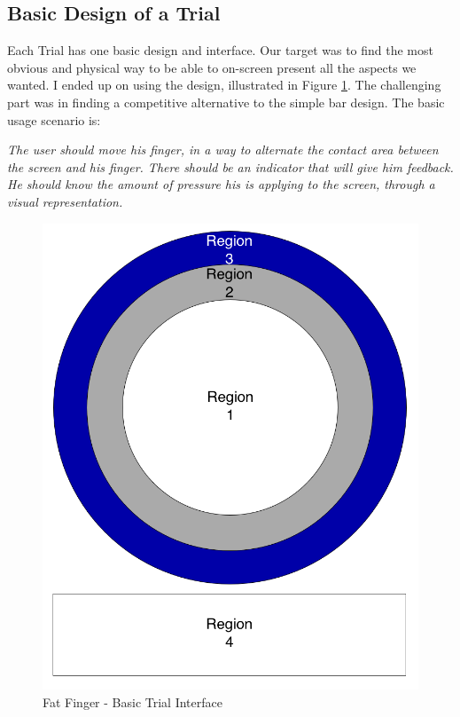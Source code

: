 \subsection{Basic Design of a Trial}
Each Trial has one basic design and interface. Our target was to find the most obvious and physical way to be able to on-screen present all the aspects we wanted. I ended up on using the design, illustrated in Figure \ref{fig:FFBasicTrialInterface}. The challenging part was in finding a competitive alternative to the simple bar design. The basic usage scenario is:

\emph{The user should move his finger, in a way to alternate the contact area between the screen and his finger. There should be an indicator that will give him feedback. He should know the amount of pressure his is applying to the screen, through a visual representation.}



 \begin{figure}[h]
\centering
\includegraphics[scale=0.3]{figures/FFBasicTrialInterface.png}
\caption{Fat Finger - Basic Trial Interface}
\label{fig:FFBasicTrialInterface}
\end{figure}

